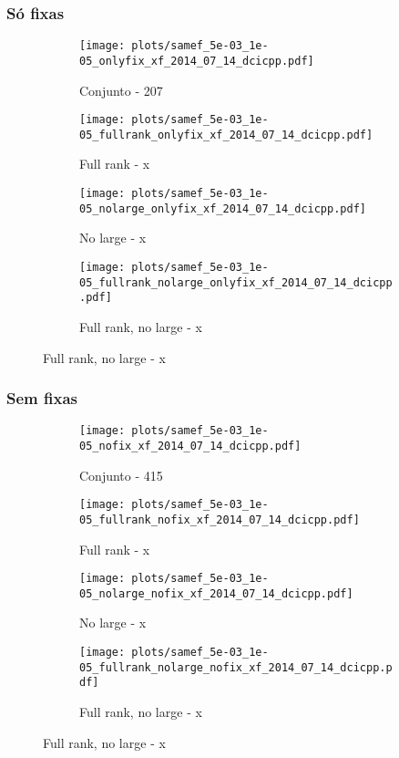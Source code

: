 \documentclass{article}
\begin{document}
\subsubsection{Só fixas}
\begin{figure}[H]
  \centering
  \begin{subfigure}{0.48\textwidth}
    \texttt{[image: plots/samef\_5e-03\_1e-05\_onlyfix\_xf\_2014\_07\_14\_dcicpp.pdf]}
    \caption{Conjunto - 207}
  \end{subfigure}
  \begin{subfigure}{0.48\textwidth}
    \texttt{[image: plots/samef\_5e-03\_1e-05\_fullrank\_onlyfix\_xf\_2014\_07\_14\_dcicpp.pdf]}
    \caption{Full rank - x}
  \end{subfigure}
  \begin{subfigure}{0.48\textwidth}
    \texttt{[image: plots/samef\_5e-03\_1e-05\_nolarge\_onlyfix\_xf\_2014\_07\_14\_dcicpp.pdf]}
    \caption{No large - x}
  \end{subfigure}
  \begin{subfigure}{0.48\textwidth}
    \texttt{[image: plots/samef\_5e-03\_1e-05\_fullrank\_nolarge\_onlyfix\_xf\_2014\_07\_14\_dcicpp.pdf]}
    \caption{Full rank, no large - x}
  \end{subfigure}
\end{figure}

\subsubsection{Sem fixas}
\begin{figure}[H]
  \centering
  \begin{subfigure}{0.48\textwidth}
    \texttt{[image: plots/samef\_5e-03\_1e-05\_nofix\_xf\_2014\_07\_14\_dcicpp.pdf]}
    \caption{Conjunto - 415}
  \end{subfigure}
  \begin{subfigure}{0.48\textwidth}
    \texttt{[image: plots/samef\_5e-03\_1e-05\_fullrank\_nofix\_xf\_2014\_07\_14\_dcicpp.pdf]}
    \caption{Full rank - x}
  \end{subfigure}
  \begin{subfigure}{0.48\textwidth}
    \texttt{[image: plots/samef\_5e-03\_1e-05\_nolarge\_nofix\_xf\_2014\_07\_14\_dcicpp.pdf]}
    \caption{No large - x}
  \end{subfigure}
  \begin{subfigure}{0.48\textwidth}
    \texttt{[image: plots/samef\_5e-03\_1e-05\_fullrank\_nolarge\_nofix\_xf\_2014\_07\_14\_dcicpp.pdf]}
    \caption{Full rank, no large - x}
  \end{subfigure}
\end{figure}



\end{document}
